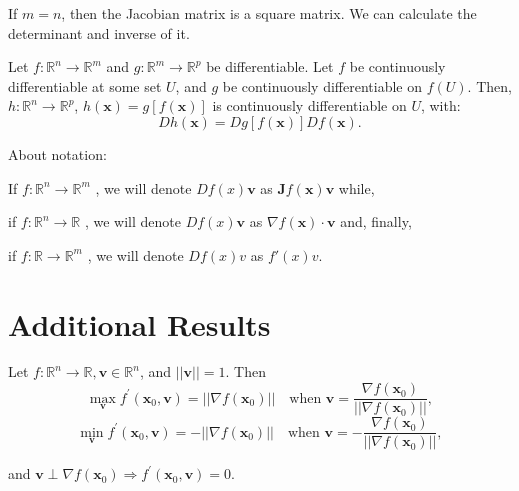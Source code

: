 \begin{remark*}
    If $m=n$, then the Jacobian matrix is a square matrix. We can calculate the determinant and inverse of it.
\end{remark*}

\begin{proposition}
    Let \(f: \mathbb{R}^{n} \rightarrow \mathbb{R}^{m}\) and \(g: \mathbb{R}^{m} \rightarrow \mathbb{R}^{p}\) be differentiable. Let \(f\) be continuously differentiable at some set \(U\), and \(g\) be continuously differentiable on \(f(U)\). Then, \(h: \mathbb{R}^{n} \rightarrow \mathbb{R}^{p}\), \(h(\mathbf{x}) = g[f(\mathbf{x})]\) is continuously differentiable on \(U\), with:
    \[
        D h(\mathbf{x}) = D g[f(\mathbf{x})]D f(\mathbf{x}).
    \]
\end{proposition}

\begin{remark*}
    About notation:

    If \(f: \mathbb{R}^{n} \rightarrow \mathbb{R}^{m}\) , we will denote
    \(D f(x)\mathbf{v}\) as \(\mathbf{J}f(\mathbf{x})\mathbf{v}\) while,

    if \(f: \mathbb{R}^{n} \rightarrow \mathbb{R}\) , we will denote
    \(D f(x)\mathbf{v}\) as \(\nabla f(\mathbf{x}) \cdot \mathbf{v}\) and,
    finally,

    if \(f: \mathbb{R} \rightarrow \mathbb{R}^{m}\) , we will denote
    \(D f(x)v\) as \(f'(x)v\).
\end{remark*}


\section{Additional Results}

\begin{proposition} Let \(f: \mathbb{R}^{n} \rightarrow \mathbb{R}, \mathbf{v} \in \mathbb{R}^{n}\), and \(||\mathbf{v}|| = 1\). Then
    \[
        \max_{\mathbf{v}}f^{\prime}(\mathbf{x}_{0},\mathbf{v}) = ||\nabla f(\mathbf{x}_{0})|| \quad \text{when } \mathbf{v} = \frac{\nabla f(\mathbf{x}_{0})}{||\nabla f(\mathbf{x}_{0})||},
    \]
    \[
        \min_{\mathbf{v}}f^{\prime}(\mathbf{x}_{0},\mathbf{v}) = -||\nabla f(\mathbf{x}_{0})|| \quad \text{when } \mathbf{v} = -\frac{\nabla f(\mathbf{x}_{0})}{||\nabla f(\mathbf{x}_{0})||},
    \]

    and \(\mathbf{v} \perp \nabla f(\mathbf{x}_{0}) \Rightarrow f^{\prime}(\mathbf{x}_{0}, \mathbf{v}) = 0\).
\end{proposition}

